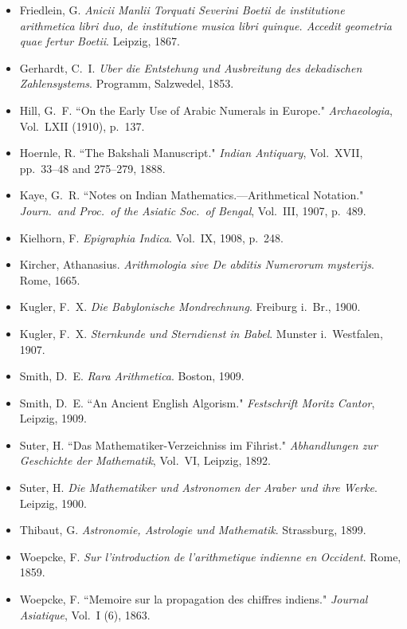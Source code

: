 \documentclass[11pt,a4paper]{article}
\begin{document}
\begin{footnotesize}
\begin{itemize}[leftmargin=2em,label={},itemsep=0.5ex]
\item Friedlein, G. \textit{Anicii Manlii Torquati Severini Boetii de institutione arithmetica libri duo, de institutione musica libri quinque. Accedit geometria quae fertur Boetii}. Leipzig, 1867.
\item Gerhardt, C.~I. \textit{Uber die Entstehung und Ausbreitung des dekadischen Zahlensystems}. Programm, Salzwedel, 1853.
\item Hill, G.~F. ``On the Early Use of Arabic Numerals in Europe." \textit{Archaeologia}, Vol.~LXII (1910), p.~137.
\item Hoernle, R. ``The Bakshali Manuscript." \textit{Indian Antiquary}, Vol.~XVII, pp.~33--48 and 275--279, 1888.
\item Kaye, G.~R. ``Notes on Indian Mathematics.---Arithmetical Notation." \textit{Journ.\ and Proc.\ of the Asiatic Soc.\ of Bengal}, Vol.~III, 1907, p.~489.
\item Kielhorn, F. \textit{Epigraphia Indica}. Vol.~IX, 1908, p.~248.
\item Kircher, Athanasius. \textit{Arithmologia sive De abditis Numerorum mysterijs}. Rome, 1665.
\item Kugler, F.~X. \textit{Die Babylonische Mondrechnung}. Freiburg i.~Br., 1900.
\item Kugler, F.~X. \textit{Sternkunde und Sterndienst in Babel}. Munster i.~Westfalen, 1907.
\item Smith, D.~E. \textit{Rara Arithmetica}. Boston, 1909.
\item Smith, D.~E. ``An Ancient English Algorism." \textit{Festschrift Moritz Cantor}, Leipzig, 1909.
\item Suter, H. ``Das Mathematiker-Verzeichniss im Fihrist." \textit{Abhandlungen zur Geschichte der Mathematik}, Vol.~VI, Leipzig, 1892.
\item Suter, H. \textit{Die Mathematiker und Astronomen der Araber und ihre Werke}. Leipzig, 1900.
\item Thibaut, G. \textit{Astronomie, Astrologie und Mathematik}. Strassburg, 1899.
\item Woepcke, F. \textit{Sur l'introduction de l'arithmetique indienne en Occident}. Rome, 1859.
\item Woepcke, F. ``Memoire sur la propagation des chiffres indiens." \textit{Journal Asiatique}, Vol.~I (6), 1863.
\end{itemize}
\end{footnotesize}
\end{document}
